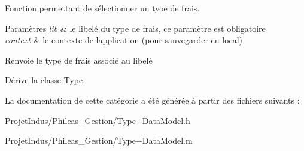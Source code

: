 Fonction permettant de sélectionner un tyoe de frais. 


\begin{DoxyParams}{Paramètres}
{\em lib} & le libelé du type de frais, ce paramètre est obligatoire \\
\hline
{\em context} & le contexte de l\textquotesingle{}application (pour sauvegarder en local) \\
\hline
\end{DoxyParams}
\begin{DoxyReturn}{Renvoie}
le type de frais associé au libelé 
\end{DoxyReturn}


Dérive la classe \hyperlink{interface_type_a232cb2698685112a988efd035534298f}{Type}.



La documentation de cette catégorie a été générée à partir des fichiers suivants \+:\begin{DoxyCompactItemize}
\item 
Projet\+Indus/\+Phileas\+\_\+\+Gestion/Type+\+Data\+Model.\+h\item 
Projet\+Indus/\+Phileas\+\_\+\+Gestion/Type+\+Data\+Model.\+m\end{DoxyCompactItemize}
